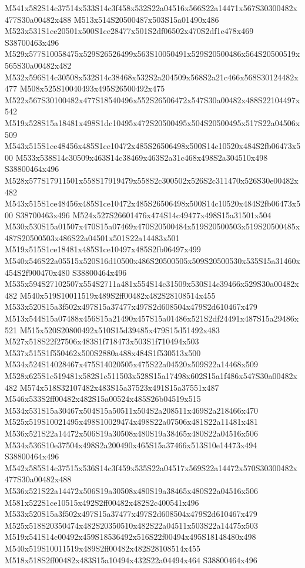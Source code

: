 \documentclass{article}
\begin{document}
\begin{multicols}{2}
M541x582S14c37514x533S14c3f458x532S22a04516x566S22a14471x567S30300482x477S30a00482x488 M513x514S20500487x503S15a01490x486 M523x531S1ce20501x500S1ce28477x501S2df06502x470S2df1e478x469 S38700463x496 M529x577S10058475x529S26526499x563S10050491x529S20500486x564S20500519x565S30a00482x482 M532x596S14c30508x532S14c38468x532S2a204509x568S2a21c466x568S30124482x477 M508x525S10040493x495S26500492x475 M522x567S30100482x477S18540496x552S26506472x547S30a00482x488S22104497x542 M519x528S15a18481x498S1dc10495x472S20500495x504S20500495x517S22a04506x509 M543x515S1ce48456x485S1ce10472x485S26506498x500S14c10520x484S2fb06473x500 M533x538S14c30509x463S14c38469x463S2a31c468x498S2a304510x498 S38800464x496 M528x577S17911501x558S17919479x558S2c300502x526S2c311470x526S30e00482x482 M543x515S1ce48456x485S1ce10472x485S26506498x500S14c10520x484S2fb06473x500 S38700463x496 M524x527S26601476x474S14c49477x498S15a31501x504 M530x530S15a01507x470S15a07469x470S20500484x519S20500503x519S20500485x487S20500503x486S22a04501x501S22a14483x501 M519x515S1ce18481x485S1ce10497x485S2fb06497x499 M540x546S22a05515x520S16d10500x486S20500505x509S20500530x535S15a31460x454S2f900470x480 S38800464x496 M535x594S27102507x554S2711a481x554S14c31509x530S14c39466x529S30a00482x482 M540x519S10011519x489S2ff00482x482S28108514x455 M533x520S15a3f502x497S15a37477x497S2d608504x479S2d610467x479 M513x544S15a07488x456S15a21490x457S15a01486x521S2df24491x487S15a29486x521 M515x520S20800492x510S15d39485x479S15d51492x483 M527x518S22f27506x483S1f718473x503S1f710494x503 M537x515S1f550462x500S2880a488x484S1f530513x500 M534x524S14028467x475S14020505x475S22a04520x509S22a14468x509 M528x625S1c519481x582S1c511503x528S15a17498x602S15a1f486x547S30a00482x482 M574x518S32107482x483S15a37523x491S15a37551x487 M546x533S2ff00482x482S15a00524x485S26b04519x515 M534x531S15a30467x504S15a50511x504S2a208511x469S2a218466x470 M525x519S10021495x498S10029474x498S22a07506x481S22a11481x481 M536x521S22a14472x506S19a30508x480S19a38465x480S22a04516x506 M534x536S10e37504x498S2a200490x465S15a37466x513S10e14473x494 S38800464x496 M542x585S14c37515x536S14c3f459x535S22a04517x569S22a14472x570S30300482x477S30a00482x488 M536x521S22a14472x506S19a30508x480S19a38465x480S22a04516x506 M581x522S1ce10515x492S2ff00482x482S2c400541x496 M533x520S15a3f502x497S15a37477x497S2d608504x479S2d610467x479 M525x518S20350474x482S20350510x482S22a04511x503S22a14475x503 M519x541S14c00492x459S18536492x516S22f00494x495S18148480x498 M540x519S10011519x489S2ff00482x482S28108514x455 M518x518S2ff00482x483S15a10494x432S22a04494x464 S38800464x496


\end{multicols}
\end{document}
